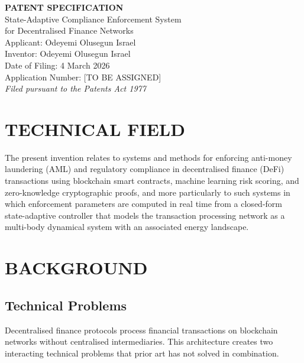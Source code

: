 \documentclass[12pt,a4paper]{article}
\begin{document}
\begin{center}
{\LARGE\bfseries PATENT SPECIFICATION}\\[1em]
{\Large State-Adaptive Compliance Enforcement System\\
for Decentralised Finance Networks}\\[2em]
{\large Applicant: Odeyemi Olusegun Israel}\\[0.5em]
{\large Inventor: Odeyemi Olusegun Israel}\\[0.5em]
{\large Date of Filing: 4 March 2026}\\[0.5em]
{\large Application Number: [TO BE ASSIGNED]}\\[0.3em]
{\normalsize \textit{Filed pursuant to the Patents Act 1977}}
\end{center}

\vspace{2em}

\section{TECHNICAL FIELD}

The present invention relates to systems and methods for enforcing
anti-money laundering (AML) and regulatory compliance in decentralised
finance (DeFi) transactions using blockchain smart contracts, machine
learning risk scoring, and zero-knowledge cryptographic proofs, and more
particularly to such systems in which enforcement parameters are computed
in real time from a closed-form state-adaptive controller that models the
transaction processing network as a multi-body dynamical system with an
associated energy landscape.

\section{BACKGROUND}

\subsection{Technical Problems}

Decentralised finance protocols process financial transactions on blockchain
networks without centralised intermediaries. This architecture creates two
interacting technical problems that prior art has not solved in combination.
\end{document}
